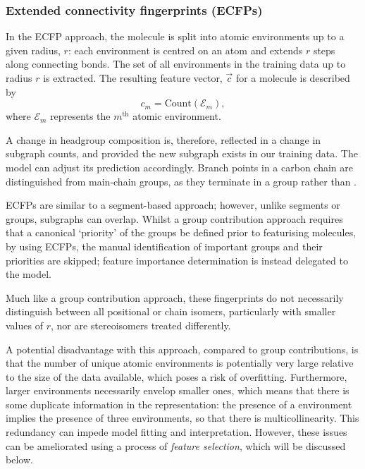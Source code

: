 \subsubsection{Extended connectivity fingerprints (ECFPs)}

In the ECFP approach, the molecule is split into atomic environments up to a
given radius, $r$: each environment is centred on an atom and extends $r$ steps
along connecting bonds. The set of all environments in the training data up to
radius $r$ is extracted. The resulting feature vector, $\vec{c}$ for a molecule
is described by
\begin{equation}
    \label{eq:ecfp}
    c_m = \text{Count}(\mathcal{E}_m),
\end{equation}
where $\mathcal{E}_m$ represents the $m^\text{th}$ atomic environment.

A change in headgroup composition is, therefore, reflected in a change in
subgraph counts, and provided the new subgraph exists in our training data. The
model can adjust its prediction accordingly. Branch points in a carbon chain are
distinguished from main-chain groups, as they terminate in a  group
rather than .

ECFPs are similar to a segment-based approach; however, unlike segments or
groups, subgraphs can overlap. Whilst a group contribution approach requires
that a canonical `priority' of the groups be defined prior to featurising
molecules, by using ECFPs, the manual identification of important groups and
their priorities are skipped; feature importance determination is instead
delegated to the model.

Much like a group contribution approach, these fingerprints do not necessarily
distinguish between all positional or chain isomers, particularly with smaller
values of $r$, nor are stereoisomers treated differently.

A potential disadvantage with this approach, compared to group contributions, is
that the number of unique atomic environments is potentially very large relative
to the size of the data available, which poses a risk of overfitting.
Furthermore, larger environments necessarily envelop smaller ones, which means
that there is some duplicate information in the representation: the presence of
a  environment implies the presence of three  environments,
so that there is multicollinearity. This redundancy can impede model fitting and
interpretation. However, these issues can be ameliorated using a process of
\emph{feature selection}, which will be discussed below.

